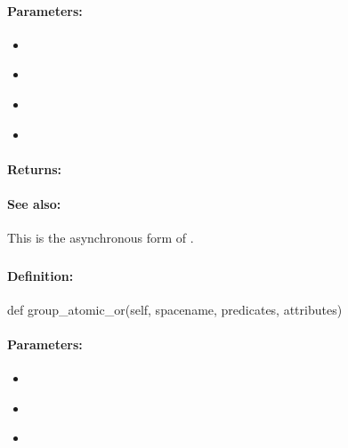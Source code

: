 \paragraph{Parameters:}
\begin{itemize}[noitemsep]
\item {}\\

\item {}\\

\item {}\\

\item {}\\

\end{itemize}

\paragraph{Returns:}


\paragraph{See also:}  This is the asynchronous form of .

\pagebreak
\subsubsection{}
\label{api:python:group_atomic_or}


\paragraph{Definition:}
\begin{pythoncode}
def group_atomic_or(self, spacename, predicates, attributes)
\end{pythoncode}

\paragraph{Parameters:}
\begin{itemize}[noitemsep]
\item {}\\

\item {}\\

\item {}\\

\end{itemize}

